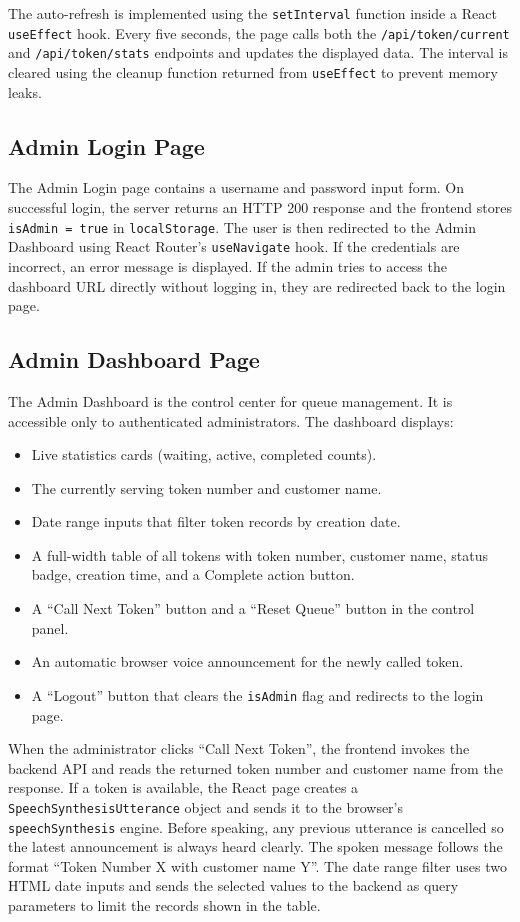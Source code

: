 The auto-refresh is implemented using the \texttt{setInterval} function inside a React \texttt{useEffect} hook. Every five seconds, the page calls both the \texttt{/api/token/current} and \texttt{/api/token/stats} endpoints and updates the displayed data. The interval is cleared using the cleanup function returned from \texttt{useEffect} to prevent memory leaks.

\subsection{Admin Login Page}

The Admin Login page contains a username and password input form. On successful login, the server returns an HTTP 200 response and the frontend stores \texttt{isAdmin = true} in \texttt{localStorage}. The user is then redirected to the Admin Dashboard using React Router's \texttt{useNavigate} hook. If the credentials are incorrect, an error message is displayed. If the admin tries to access the dashboard URL directly without logging in, they are redirected back to the login page.

\subsection{Admin Dashboard Page}

The Admin Dashboard is the control center for queue management. It is accessible only to authenticated administrators. The dashboard displays:
\begin{itemize}
    \item Live statistics cards (waiting, active, completed counts).
    \item The currently serving token number and customer name.
        \item Date range inputs that filter token records by creation date.
    \item A full-width table of all tokens with token number, customer name, status badge, creation time, and a Complete action button.
    \item A ``Call Next Token'' button and a ``Reset Queue'' button in the control panel.
    \item An automatic browser voice announcement for the newly called token.
    \item A ``Logout'' button that clears the \texttt{isAdmin} flag and redirects to the login page.
\end{itemize}

When the administrator clicks ``Call Next Token'', the frontend invokes the backend API and reads the returned token number and customer name from the response. If a token is available, the React page creates a \texttt{SpeechSynthesisUtterance} object and sends it to the browser's \texttt{speechSynthesis} engine. Before speaking, any previous utterance is cancelled so the latest announcement is always heard clearly. The spoken message follows the format ``Token Number X with customer name Y''. The date range filter uses two HTML date inputs and sends the selected values to the backend as query parameters to limit the records shown in the table.

